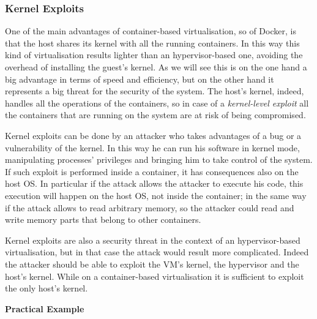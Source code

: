 \documentclass[a4paper,12pt]{article}
\begin{document}
\subsubsection{Kernel Exploits}

One of the main advantages of container-based virtualisation, so of Docker,
is that the host shares its kernel with all the running containers. In this way
this kind of virtualisation results lighter than an hypervisor-based one,
avoiding the overhead of installing the guest's kernel. As we will see this is
on the one hand a big advantage in terms of speed and efficiency, but on the
other hand it represents a big threat for the security of the system. The host's
kernel, indeed, handles all the operations of the containers, so in case of a
\textit{kernel-level exploit} all the containers that are running on the system
are at risk of being compromised.\par Kernel exploits can be done by an attacker
who takes advantages of a bug or a vulnerability of the kernel. In this way he
can run his software in kernel mode, manipulating processes' privileges and
bringing him to take control of the system. If such exploit is performed inside
a container, it has consequences also on the host OS. In particular if the
attack allows the attacker to execute his code, this execution will happen on
the host OS, not inside the container; in the same way if the attack allows to
read arbitrary memory, so the attacker could read and write memory parts that
belong to other containers.\par Kernel exploits are also a security threat in
the context of an hypervisor-based virtualisation, but in that case the attack
would result more complicated. Indeed the attacker should be able to exploit the
VM's kernel, the hypervisor and the host's kernel. While on a container-based
virtualisation it is sufficient to exploit the only host's kernel.

\bigbreak\textbf{Practical Example}\bigbreak 
\end{document}
